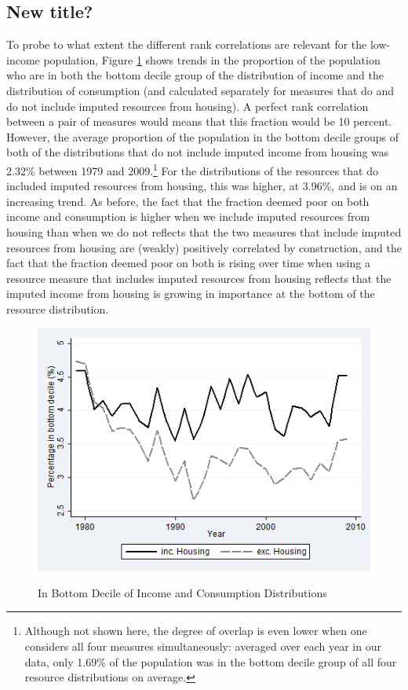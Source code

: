 \subsection{New title?}

To probe to what extent the different rank correlations are relevant for the low-income population, Figure \ref{fig:overlap} shows trends in the proportion of the population who are in both the bottom decile group of the distribution of income and the distribution of consumption (and calculated separately for measures that do and do not include imputed resources from housing). A perfect rank correlation between a pair of measures would means that this fraction would be 10 percent. However, the average proportion of the population in the bottom decile groups of both of the distributions that do not include imputed income from housing was 2.32\% between 1979 and 2009.\footnote{Although not shown here, the degree of overlap is even lower when one considers all four measures simultaneously: averaged over each year in our data, only 1.69\% of the population was in the bottom decile group of all four resource distributions on average.} For the distributions of the resources that do included imputed resources from housing, this was higher, at 3.96\%, and is on an increasing trend. As before, the fact that the fraction deemed poor on both income and consumption is higher when we include imputed resources from housing than when we do not reflects that the two measures that include imputed resources from housing are (weakly) positively correlated by construction, and the fact that the fraction deemed poor on both is rising over time when using a resource measure that includes imputed resources from housing reflects that the imputed income from housing is growing in importance at the bottom of the resource distribution.


\begin{figure}
\caption{In Bottom Decile of Income and Consumption Distributions}
\centering
\includegraphics[width=.7\linewidth]{pictures/overlap.png}
\label{fig:overlap}
\end{figure}


